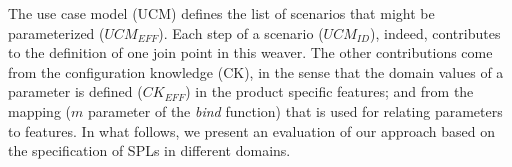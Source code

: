 \documentclass[11pt]{report}
\begin{document}
The use case model (UCM) defines the list of scenarios that might be parameterized ($UCM_{EFF}$). Each step of a scenario ($UCM_{ID}$), indeed, contributes to the definition of one join point in this weaver. The 
other contributions come from the configuration knowledge (CK), in the sense that the domain values 
of a parameter is defined ($CK_{EFF}$) in the product specific features; and from the mapping ($m$ parameter of the \emph{bind} function) that is used for relating parameters to features. In what follows, we present an evaluation of our approach based on the specification of SPLs in different domains. 







\end{document}
